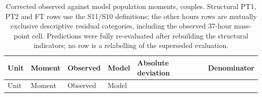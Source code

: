 \small\setlength{\tabcolsep}{3pt}\begin{longtable}[]{@{}
  >{\raggedright\arraybackslash}p{}
  >{\raggedright\arraybackslash}p{}
  >{\raggedright\arraybackslash}p{}
  >{\raggedright\arraybackslash}p{}
  >{\raggedright\arraybackslash}p{}
  >{\raggedright\arraybackslash}p{}@{}}
\caption{Corrected observed against model population moments, couples. Structural PT1, PT2 and FT rows use the S11/S10 definitions; the other hours rows are mutually exclusive descriptive residual categories, including the observed 37-hour mass-point cell. Predictions were fully re-evaluated after rebuilding the structural indicators; no row is a relabelling of the superseded evaluation.}\tabularnewline
\toprule\noalign{}
\begin{minipage}[b]{\linewidth}\raggedright
Unit
\end{minipage} & \begin{minipage}[b]{\linewidth}\raggedright
Moment
\end{minipage} & \begin{minipage}[b]{\linewidth}\raggedright
Observed
\end{minipage} & \begin{minipage}[b]{\linewidth}\raggedright
Model
\end{minipage} & \begin{minipage}[b]{\linewidth}\raggedright
Absolute deviation
\end{minipage} & \begin{minipage}[b]{\linewidth}\raggedright
Denominator
\end{minipage} \\
\midrule\noalign{}
\endfirsthead
\toprule\noalign{}
\begin{minipage}[b]{\linewidth}\raggedright
Unit
\end{minipage} & \begin{minipage}[b]{\linewidth}\raggedright
Moment
\end{minipage} & \begin{minipage}[b]{\linewidth}\raggedright
Observed
\end{minipage} & \begin{minipage}[b]{\linewidth}\raggedright
Model
\end{minipage} & \begin{minipage}[b]{\linewidth}\raggedright

\end{minipage}
\end{longtable}
